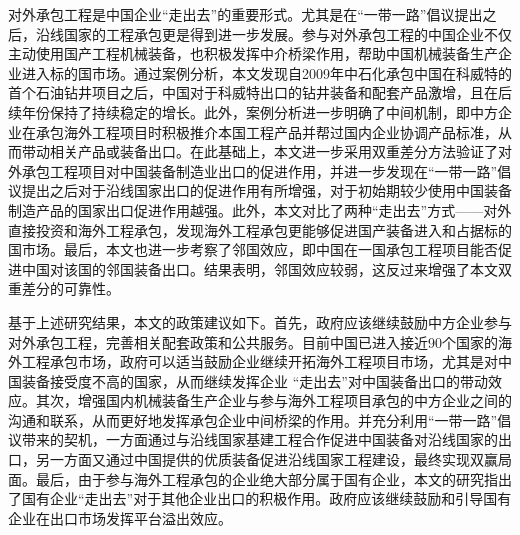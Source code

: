 \documentclass[a4paper,12pt]{article}
\begin{document}
\vspace{0.5em}  %

对外承包工程是中国企业“走出去”的重要形式。尤其是在“一带一路”倡议提出之后，沿线国家的工程承包更是得到进一步发展。参与对外承包工程的中国企业不仅主动使用国产工程机械装备，也积极发挥中介桥梁作用，帮助中国机械装备生产企业进入标的国市场。通过案例分析，本文发现自2009年中石化承包中国在科威特的首个石油钻井项目之后，中国对于科威特出口的钻井装备和配套产品激增，且在后续年份保持了持续稳定的增长。此外，案例分析进一步明确了中间机制，即中方企业在承包海外工程项目时积极推介本国工程产品并帮过国内企业协调产品标准，从而带动相关产品或装备出口。在此基础上，本文进一步采用双重差分方法验证了对外承包工程项目对中国装备制造业出口的促进作用，并进一步发现在“一带一路”倡议提出之后对于沿线国家出口的促进作用有所增强，对于初始期较少使用中国装备制造产品的国家出口促进作用越强。此外，本文对比了两种“走出去”方式——对外直接投资和海外工程承包，发现海外工程承包更能够促进国产装备进入和占据标的国市场。最后，本文也进一步考察了邻国效应，即中国在一国承包工程项目能否促进中国对该国的邻国装备出口。结果表明，邻国效应较弱，这反过来增强了本文双重差分的可靠性。

\vspace{0.5em}  %

基于上述研究结果，本文的政策建议如下。首先，政府应该继续鼓励中方企业参与对外承包工程，完善相关配套政策和公共服务。目前中国已进入接近90个国家的海外工程承包市场，政府可以适当鼓励企业继续开拓海外工程项目市场，尤其是对中国装备接受度不高的国家，从而继续发挥企业 “走出去”对中国装备出口的带动效应。其次，增强国内机械装备生产企业与参与海外工程项目承包的中方企业之间的沟通和联系，从而更好地发挥承包企业中间桥梁的作用。并充分利用“一带一路”倡议带来的契机，一方面通过与沿线国家基建工程合作促进中国装备对沿线国家的出口，另一方面又通过中国提供的优质装备促进沿线国家工程建设，最终实现双赢局面。最后，由于参与海外工程承包的企业绝大部分属于国有企业，本文的研究指出了国有企业“走出去”对于其他企业出口的积极作用。政府应该继续鼓励和引导国有企业在出口市场发挥平台溢出效应。








\end{document}
